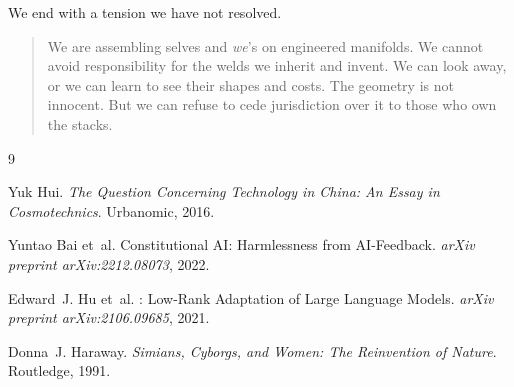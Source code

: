 We end with a tension we have not resolved.

\begin{quote}
We are assembling selves and \emph{we}'s on engineered manifolds. We cannot avoid responsibility for the welds we inherit and invent. We can look away, or we can learn to see their shapes and costs. The geometry is not innocent. But we can refuse to cede jurisdiction over it to those who own the stacks.
\end{quote}


\begin{thebibliography}{9}

Yuk Hui.
\newblock \emph{The Question Concerning Technology in China: An Essay in Cosmotechnics}.
\newblock Urbanomic, 2016.

Yuntao Bai et~al.
\newblock Constitutional {AI}: Harmlessness from {AI}-Feedback.
\newblock \emph{arXiv preprint arXiv:2212.08073}, 2022.

Edward~J. Hu et~al.
: Low-Rank Adaptation of Large Language Models.
\newblock \emph{arXiv preprint arXiv:2106.09685}, 2021.

Donna~J. Haraway.
\newblock \emph{Simians, Cyborgs, and Women: The Reinvention of Nature}.
\newblock Routledge, 1991.

\end{thebibliography}
